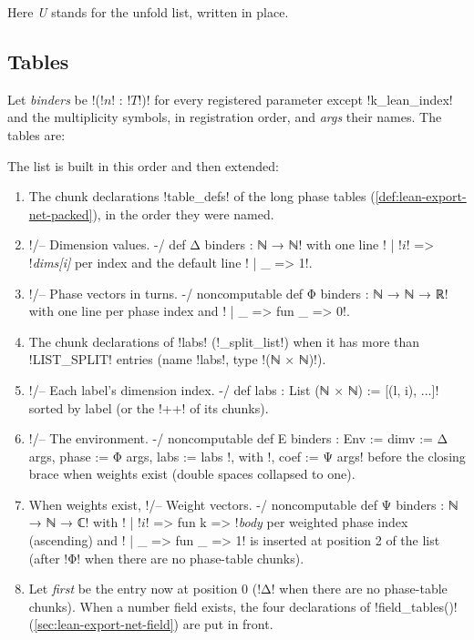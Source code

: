 {\noindent Here \textit{U} stands for the unfold list, written in place.

\subsection{Tables}\label{sec:lean-export-net-tables}\label{sec:lean-export-net-family-tables}

Let \textit{binders} be \code!(!$n$\code! : !$T$\code!)! for every registered parameter except
\code!k_lean_index! and the multiplicity symbols, in registration order, and \textit{args} their
names. The tables are:

The list is built in this order and then extended:
\begin{enumerate}
\item The chunk declarations \py!table_defs! of the long phase tables
  (\cref{def:lean-export-net-packed}), in the order they were named.
\item \leanx!/-- Dimension values. -/ def Δ binders : ℕ → ℕ! with one line
  \code!  | !$i$\code! => !\textit{dims[i]} per index and the default line \code!  | _ => 1!.
\item \leanx!/-- Phase vectors in turns. -/ noncomputable def Φ binders : ℕ → ℕ → ℝ! with one
  line per phase index and \code!  | _ => fun _ => 0!.
\item The chunk declarations of \code!labs! (\py!_split_list!) when it
  has more than \py!LIST_SPLIT! entries (name \code!labs!, type \code!(ℕ × ℕ)!).
\item \code!/-- Each label's dimension index. -/ def labs : List (ℕ × ℕ) := [(l, i), ...]! sorted
  by label (or the \code!++! of its chunks).
\item \leanx!/-- The environment. -/ noncomputable def E binders : Env := { dimv := Δ args, phase := Φ args, labs := labs }!,
  with \leanx!, coef := Ψ args! before the closing brace when weights exist (double spaces
  collapsed to one).
\item When weights exist, \leanx!/-- Weight vectors. -/ noncomputable def Ψ binders : ℕ → ℕ → ℂ!
  with \code!  | !$i$\code! => fun k => !\textit{body} per weighted phase index (ascending) and
  \code!  | _ => fun _ => 1! is inserted at position 2 of the list (after \leanx!Φ! when there
  are no phase-table chunks).
\item Let \textit{first} be the entry now at position 0 (\leanx!Δ! when there are no phase-table
  chunks). When a number field exists, the four declarations of \py!field_tables()!
  (\cref{sec:lean-export-net-field}) are put in front.

\end{enumerate}}
